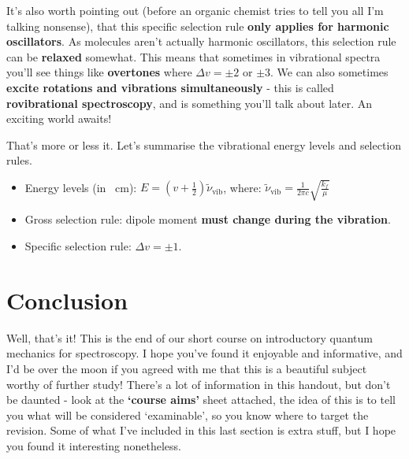 \documentclass{memoir}[11pt,oneside,a4paper,openany]
\newenvironment{myexampleblock}[1]{%
    \tcolorbox[beamer,%
    noparskip,breakable,
    colback=LightGreen,colframe=DarkGreen,%
    colbacklower=LimeGreen!75!LightGreen,%
    title=#1]}%
    {\endtcolorbox}
\begin{document}
It's also worth pointing out (before an organic chemist tries to tell you all I'm talking nonsense), that this specific selection rule \textbf{only applies for harmonic oscillators}. As molecules aren't actually harmonic oscillators, this selection rule can be \textbf{relaxed} somewhat. This means that sometimes in vibrational spectra you'll see things like \textbf{overtones} where $\Delta v = \pm 2$ or $\pm 3$. We can also sometimes \textbf{excite rotations and vibrations simultaneously} - this is called \textbf{rovibrational spectroscopy}, and is something you'll talk about later. An exciting world awaits!

That's more or less it. Let's summarise the vibrational energy levels and selection rules.
\vspace{2cm}
\begin{myexampleblock}{\begin{center}Vibrational Spectroscopy\end{center}}
	\begin{center}
		\begin{itemize}
			\item Energy levels (in \si{\per\centi\metre}): $E = (v+\frac{1}{2})\tilde{\nu}_{\text{vib}}$, where: $\tilde{\nu}_{\text{vib}} = \frac{1}{2\pi c}\sqrt{\frac{k_f}{\mu}}$
			\item Gross selection rule: dipole moment \textbf{must change during the vibration}.
			\item Specific selection rule: $\Delta v = \pm 1$.
		\end{itemize}
		\end{center}
\end{myexampleblock}

\section{Conclusion}
Well, that's it! This is the end of our short course on introductory quantum mechanics for spectroscopy. I hope you've found it enjoyable and informative, and I'd be over the moon if you agreed with me that this is a beautiful subject worthy of further study! There's a lot of information in this handout, but don't be daunted - look at the \textbf{`course aims'} sheet attached, the idea of this is to tell you what will be considered `examinable', so you know where to target the revision. Some of what I've included in this last section is extra stuff, but I hope you found it interesting nonetheless.

\appendixpage
\appendix
\end{document}
